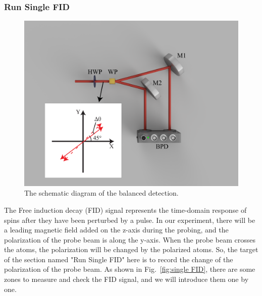 \documentclass{article}
\begin{document}
\subsubsection{Run Single FID}

\begin{figure}[htbp]
    \centering
    \includegraphics[width=0.9\linewidth]{fig/Rotation.pdf}
    \caption{The schematic diagram of the balanced detection.}
    \label{fig:rotation}
\end{figure}

The Free induction decay (FID) signal represents the time-domain response of spins after they have been perturbed by a pulse. In our experiment, there will be a leading magnetic field added on the z-axis during the probing, and the polarization of the probe beam is along the y-axis. When the probe beam crosses the atoms, the polarization will be changed by the polarized atoms. So, the target of the section named "Run Single FID" here is to record the change of the polarization of the probe beam. As shown in Fig.~\ref{fig:single FID}, there are some zones to measure and check the FID signal, and we will introduce them one by one.
\end{document}
